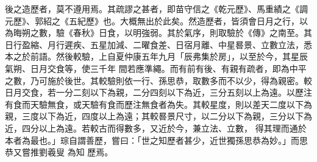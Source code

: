 \begin{pinyinscope}
 後之造歷者，莫不遵用焉。其疏謬之甚者，即苗守信之《乾元歷》、馬重績之《調元歷》、郭紹之《五紀歷》也。大概無出於此矣。然造歷者，皆須會日月之行，以為晦朔之數，驗《春秋》日食，以明強弱。其於氣序，則取驗於《傳》之南至。其日行盈縮、月行遲疾、五星加減、二曜食差、日宿月離、中星晷景、立數立法，悉本之於前語。然後較驗，上自夏仲康五年九月「辰弗集於房」，以至於今，其星辰氣朔、日月交食等，使三千年
 間若應準繩。而有前有後、有親有疏者，即為中平之數，乃可施於後世。其較驗則依一行、孫思恭，取數多而不以少，得為親密。較日月交食，若一分二刻以下為親，二分四刻以下為近，三分五刻以上為遠。以歷注有食而天驗無食，或天驗有食而歷注無食者為失。其較星度，則以差天二度以下為親，三度以下為近，四度以上為遠；其較晷景尺寸，以二分以下為親，三分以下為近，四分以上為遠。若較古而得數多，又近於今，兼立法、立數，
 得其理而通於本者為最也。」琮自謂善歷，嘗曰：「世之知歷者甚少，近世獨孫思恭為妙。」而思恭又嘗推劉羲叟
 為知
 歷焉。



\end{pinyinscope}